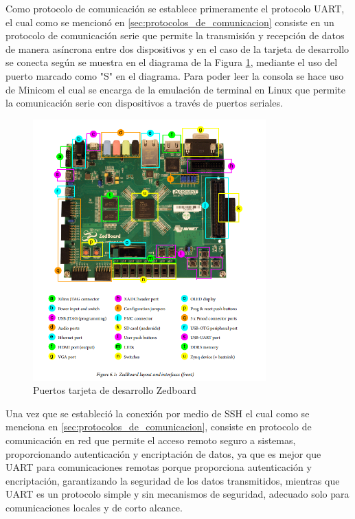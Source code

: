 Como protocolo de comunicación se establece primeramente el protocolo UART, el cual como se mencionó en \ref{sec:protocolos_de_comunicacion} consiste en un protocolo de comunicación serie que permite la transmisión y recepción de datos de manera asíncrona entre dos dispositivos y en el caso de la tarjeta de desarrollo se conecta según se muestra en el diagrama de la Figura \ref{fig:puertos_zedboard}, mediante el uso del puerto marcado como "S" en el diagrama. Para poder leer la consola se hace uso de Minicom el cual se encarga de la emulación de terminal en Linux que permite la comunicación serie con dispositivos a través de puertos seriales.

\begin{figure}[h!]
    \centering
    \includegraphics[width=0.8\textwidth]{fig/especifico_2/154140ZedBoard.png}
    \caption{Puertos tarjeta de desarrollo Zedboard}
    \label{fig:puertos_zedboard}
\end{figure}


Una vez que se estableció la conexión por medio de SSH el cual como se menciona en \ref{sec:protocolos_de_comunicacion}, consiste en protocolo de comunicación en red que permite el acceso remoto seguro a sistemas, proporcionando autenticación y encriptación de datos, ya que es mejor que UART para comunicaciones remotas porque proporciona autenticación y encriptación, garantizando la seguridad de los datos transmitidos, mientras que UART es un protocolo simple y sin mecanismos de seguridad, adecuado solo para comunicaciones locales y de corto alcance. 

